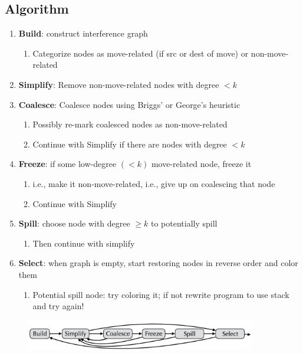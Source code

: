 \documentclass[a4paper]{exam}
\theoremstyle{definition}
\begin{document}
\subsection{Algorithm}
\begin{enumerate}
    \item \textbf{Build}: construct interference graph
    \begin{enumerate}
        \item Categorize nodes as move-related (if src or dest of move) or non-move-related
    \end{enumerate}
 
\item \textbf{Simplify}: Remove non-move-related nodes with degree $<k$
\item \textbf{Coalesce}: Coalesce nodes using Briggs' or George's heuristic
\begin{enumerate}
    \item Possibly re-mark coalesced nodes as non-move-related
    \item Continue with Simplify if there are nodes with degree $<k$
\end{enumerate}

\item \textbf{Freeze}: if some low-degree $(<k)$ move-related node, freeze it
\begin{enumerate}
    \item i.e., make it non-move-related, i.e., give up on coalescing that node
    \item Continue with Simplify
\end{enumerate}
\item \textbf{Spill}: choose node with degree $\geq k$ to potentially spill
\begin{enumerate}
    \item Then continue with simplify
\end{enumerate}
\item \textbf{Select}: when graph is empty, start restoring nodes in reverse order and color them
\begin{enumerate}
\item Potential spill node: try coloring it; if not rewrite program to use stack and try again!
\end{enumerate}
\end{enumerate}
\begin{figure}[htbp]
  \centering
  \includegraphics[width=10cm]{./img/reg_coalescing.png}
\end{figure}
\end{document}
